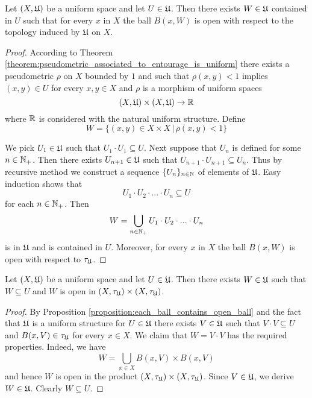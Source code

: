 \begin{proposition}\label{proposition:each_ball_contains_open_ball}
Let $(X,{\mathfrak U})$ be a uniform space and let $U \in {\mathfrak U}$. Then there exists $W \in {\mathfrak U}$ contained in $U$ such that for every $x$ in $X$ the ball $B(x,W)$ is open with respect to the topology induced by ${\mathfrak U}$ on $X$.
\end{proposition}
\begin{proof}
According to Theorem \ref{theorem:pseudometric_associated_to_entourage_is_uniform} there exists a pseudometric $\rho$ on $X$ bounded by $1$ and such that 
$\rho(x,y) < 1$ implies $(x,y)\in U$ for every $x,y\in X$ and $\rho$ is a morphism of uniform spaces
$$\left(X,{\mathfrak U}\right)\times \left(X,{\mathfrak U}\right) \rightarrow {\mathbb R}$$
where ${\mathbb R}$ is considered with the natural uniform structure. Define 
$$W = \big\{(x,y)\in X\times X\,\big|\,\rho(x,y) < 1\big\}$$


We pick $U_1 \in {\mathfrak U}$ such that $U_1\cdot U_1 \subseteq U$. Next suppose that $U_n$ is defined for some $n\in {\mathbb N}_+$. Then there exists $U_{n+1}\in {\mathfrak U}$ such that $U_{n+1}\cdot U_{n+1} \subseteq U_n$. Thus by recursive method we construct a sequence $\{U_n\}_{n\in {\mathbb N}}$ of elements of ${\mathfrak U}$. Easy induction shows that
$$U_1\cdot U_2\cdot ...\cdot U_n \subseteq U$$
for each $n\in {\mathbb N}_+$. Then
$$W = \bigcup_{n\in {\mathbb N}_+}U_{1}\cdot U_{2}\cdot ...\cdot U_{n}$$
is in ${\mathfrak U}$ and is contained in $U$. Moreover, for every $x$ in $X$ the ball $B(x,W)$ is open with respect to $\tau_{{\mathfrak U}}$.
\end{proof}

\begin{corollary}\label{corollary:each_entourage_contains_open_subset_in_square}
Let $(X,{\mathfrak U})$ be a uniform space and let $U \in {\mathfrak U}$. Then there exists $W \in {\mathfrak U}$ such that $W\subseteq U$ and $W$ is open in $\left(X,\tau_{{\mathfrak U}}\right) \times \left(X,\tau_{{\mathfrak U}}\right)$.
\end{corollary}
\begin{proof}
By Proposition \ref{proposition:each_ball_contains_open_ball} and the fact that ${\mathfrak U}$ is a uniform structure for $U \in {\mathfrak U}$ there exists $V \in {\mathfrak U}$ such that $V\cdot V\subseteq U$ and $B(x,V) \in \tau_{{\mathfrak U}}$ for every $x \in X$. We claim that $W = V\cdot V$ has the required properties. Indeed, we have
$$W = \bigcup_{x\in X}B(x,V)\times B(x,V)$$
and hence $W$ is open in the product $\left(X,\tau_{{\mathfrak U}}\right) \times \left(X,\tau_{{\mathfrak U}}\right)$. Since $V \in {\mathfrak U}$, we derive $W \in {\mathfrak U}$. Clearly $W\subseteq U$. 
\end{proof}


